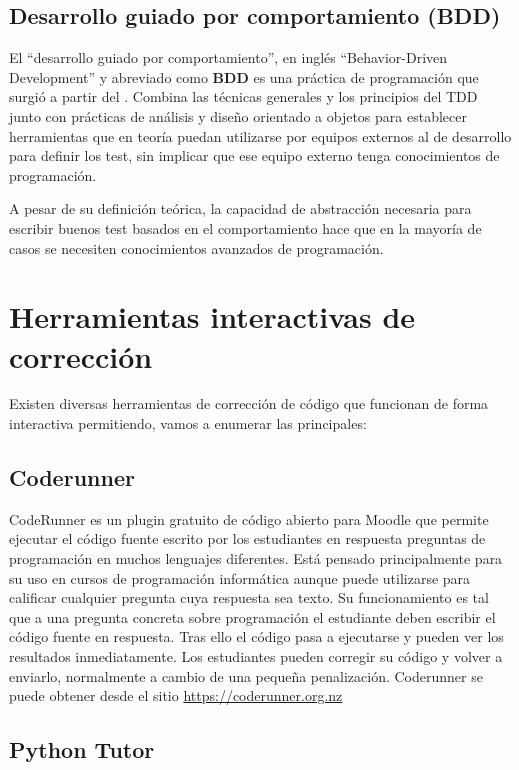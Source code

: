 \subsection {Desarrollo guiado por comportamiento (BDD)}

El ``desarrollo guiado por comportamiento'', en inglés ``Behavior-Driven Development'' y abreviado como \textbf{BDD} es una práctica de programación que surgió a partir del . Combina las técnicas generales y los principios del TDD junto con prácticas de análisis y diseño orientado a objetos para establecer herramientas que en teoría puedan utilizarse por equipos externos al de desarrollo para definir los test, sin implicar que ese equipo externo tenga conocimientos de programación.

\bigskip
A pesar de su definición teórica, la capacidad de abstracción necesaria para escribir buenos test basados en el comportamiento hace que en la mayoría de casos se necesiten conocimientos avanzados de programación.

\section {Herramientas interactivas de corrección}

Existen diversas herramientas de corrección de código que funcionan de forma interactiva permitiendo, vamos a enumerar las principales:

\subsection {Coderunner}

CodeRunner es un plugin gratuito de código abierto para Moodle que permite ejecutar el código fuente escrito por los estudiantes en respuesta preguntas de programación en muchos lenguajes diferentes. Está pensado principalmente para su uso en cursos de programación informática aunque puede utilizarse para calificar cualquier pregunta cuya respuesta sea texto. Su funcionamiento es tal que a una pregunta concreta sobre programación el estudiante deben escribir el código fuente en respuesta. Tras ello el código pasa a ejecutarse y pueden ver los resultados inmediatamente. Los estudiantes pueden corregir su código y volver a enviarlo, normalmente a cambio de una pequeña penalización. Coderunner se puede obtener desde el sitio \url{https://coderunner.org.nz}

\subsection {Python Tutor}

